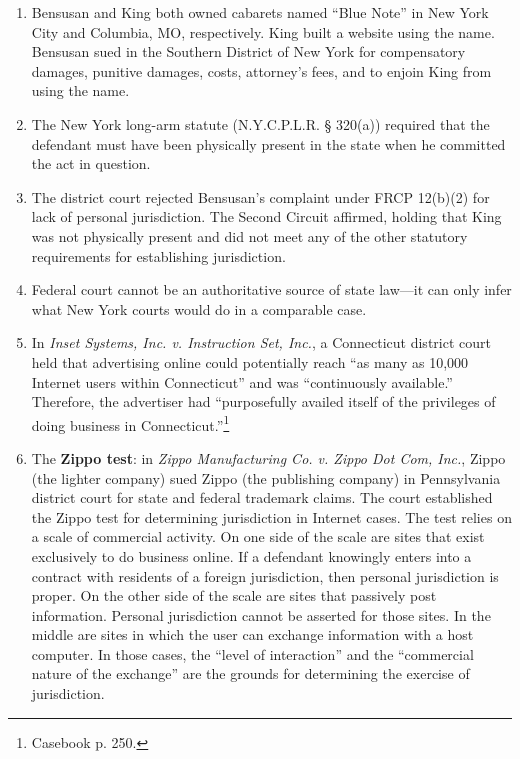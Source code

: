\begin{enumerate}
    \item Bensusan and King both owned cabarets named ``Blue Note'' in New 
    York City and Columbia, MO, respectively. King built a website using the 
    name. Bensusan sued in the Southern District of New York for compensatory 
    damages, punitive damages, costs, attorney's fees, and to enjoin King from 
    using the name.
    \item The New York long-arm statute (N.Y.C.P.L.R. § 320(a)) required that 
    the defendant must have been physically present in the state when he 
    committed the act in question.
    \item The district court rejected Bensusan's complaint under FRCP 12(b)(2) 
    for lack of personal jurisdiction. The Second Circuit affirmed, holding
    that King was not physically present and did not meet any of the other 
    statutory requirements for establishing jurisdiction.
    \item Federal court cannot be an authoritative source of state law---it 
    can only infer what New York courts would do in a comparable case.
    \item In \emph{Inset Systems, Inc. v. Instruction Set, Inc.}, a 
    Connecticut district court held that advertising online could potentially 
    reach ``as many as 10,000 Internet users within Connecticut'' and was 
    ``continuously available.'' Therefore, the advertiser had ``purposefully 
    availed itself of the privileges of doing business in 
    Connecticut.''\footnote{Casebook p. 250.}
    \item The \textbf{Zippo test}: in \emph{Zippo Manufacturing Co. v. Zippo 
    Dot Com, Inc.}, Zippo (the lighter company) sued Zippo (the publishing 
    company) in Pennsylvania district court for state and federal trademark 
    claims. The court established the Zippo test for determining jurisdiction 
    in Internet cases. The test relies on a scale of commercial activity. On 
    one side of the scale are sites that exist exclusively to do business 
    online.  If a defendant knowingly enters into a contract with residents of 
    a foreign jurisdiction, then personal jurisdiction is proper. On the other 
    side of the scale are sites that passively post information. Personal 
    jurisdiction cannot be asserted for those sites. In the middle are sites 
    in which the user can exchange information with a host computer. In those 
    cases, the ``level of interaction'' and the ``commercial nature of the 
    exchange'' are the grounds for determining the exercise of jurisdiction.  
    \end{enumerate}

